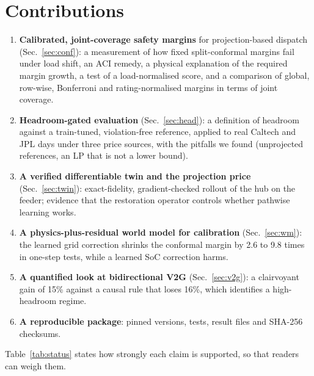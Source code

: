 \documentclass[11pt]{article}
\begin{document}
\section{Contributions}
\begin{enumerate}
\item \textbf{Calibrated, joint-coverage safety margins} for projection-based dispatch (Sec.~\ref{sec:conf}): a measurement of how fixed split-conformal margins fail under load shift, an ACI remedy, a physical explanation of the required margin growth, a test of a load-normalised score, and a comparison of global, row-wise, Bonferroni and rating-normalised margins in terms of joint coverage.
\item \textbf{Headroom-gated evaluation} (Sec.~\ref{sec:head}): a definition of headroom against a train-tuned, violation-free reference, applied to real Caltech and JPL days under three price sources, with the pitfalls we found (unprojected references, an LP that is not a lower bound).
\item \textbf{A verified differentiable twin and the projection price} (Sec.~\ref{sec:twin}): exact-fidelity, gradient-checked rollout of the hub on the feeder; evidence that the restoration operator controls whether pathwise learning works.
\item \textbf{A physics-plus-residual world model for calibration} (Sec.~\ref{sec:wm}): the learned grid correction shrinks the conformal margin by 2.6 to 9.8 times in one-step tests, while a learned SoC correction harms.
\item \textbf{A quantified look at bidirectional V2G} (Sec.~\ref{sec:v2g}): a clairvoyant gain of 15\% against a causal rule that loses 16\%, which identifies a high-headroom regime.
\item \textbf{A reproducible package}: pinned versions, tests, result files and SHA-256 checksums.
\end{enumerate}
Table~\ref{tab:status} states how strongly each claim is supported, so that readers can weigh them.
\end{document}

